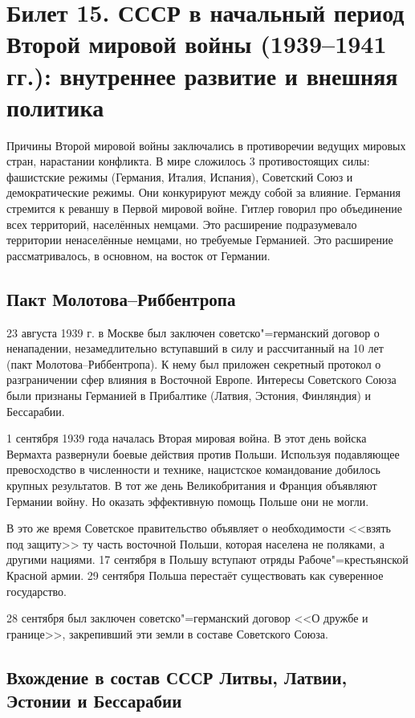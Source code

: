 \section{Билет 15. СССР в начальный период Второй мировой войны (1939--1941 гг.): внутреннее развитие и внешняя политика}

Причины Второй мировой войны заключались в противоречии ведущих мировых стран, нарастании конфликта. В мире сложилось 3 противостоящих силы: фашистские режимы (Германия, Италия, Испания), Советский Союз и демократические режимы. Они конкурируют между собой за влияние. Германия стремится к реваншу в Первой мировой войне. Гитлер говорил про объединение всех территорий, населённых немцами. Это расширение подразумевало территории ненаселённые немцами, но требуемые Германией. Это расширение рассматривалось, в основном, на восток от Германии.


\subsection{Пакт Молотова--Риббентропа}

23 августа 1939 г. в Москве был заключен советско"=германский договор о ненападении,
незамедлительно вступавший в силу и рассчитанный на 10 лет (пакт Молотова--Риббентропа). К нему был приложен секретный протокол о разграничении сфер влияния в Восточной Европе. Интересы Советского Союза были признаны Германией в Прибалтике
(Латвия, Эстония, Финляндия) и Бессарабии.

1 сентября 1939 года началась Вторая мировая война. В этот день войска
Вермахта развернули боевые действия против Польши. Используя подавляющее
превосходство в численности и технике, нацистское командование добилось
крупных результатов. В тот же день Великобритания и Франция объявляют Германии войну. Но оказать эффективную помощь Польше они не могли.

В это же время Советское правительство объявляет о необходимости <<взять под защиту>> ту часть восточной Польши, которая населена не поляками, а другими нациями. 17 сентября в Польшу вступают отряды Рабоче"=крестьянской Красной армии. 29 сентября Польша перестаёт существовать как суверенное государство.

28 сентября был заключен советско"=германский договор <<О дружбе и границе>>, закрепивший эти земли в составе Советского Союза.

\subsection{Вхождение в состав СССР Литвы, Латвии, Эстонии и Бессарабии}

